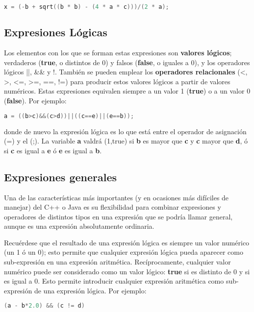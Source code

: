\begin{lstlisting}[language=C++]
x = (-b + sqrt((b * b) - (4 * a * c)))/(2 * a);
\end{lstlisting}

\subsection{Expresiones Lógicas}
Los elementos con los que se forman estas expresiones son \textbf{valores lógicos}; verdaderos (\textbf{true},
o distintos de 0) y falsos (\textbf{false}, o iguales a 0), y los operadores lógicos ||, \&\& y !. También
se pueden emplear los \textbf{operadores relacionales} (<, >, <=, >=, ==, !=) para producir
estos valores lógicos a partir de valores numéricos. Estas expresiones equivalen siempre a un
valor 1 (\textbf{true}) o a un valor 0 (\textbf{false}). Por ejemplo:

\begin{lstlisting}[language=C++]
a = ((b>c)&&(c>d))||((c==e)||(e==b));
\end{lstlisting}

donde de nuevo la expresión lógica es lo que está entre el operador de asignación (=) y el (;).
La variable \textbf{a} valdrá (1,true) si \textbf{b} es mayor que \textbf{c} y \textbf{c} mayor que \textbf{d}, ó si \textbf{c} es igual a \textbf{e} ó \textbf{e} es igual a \textbf{b}.

\subsection{Expresiones generales}
Una de las características más importantes (y en ocasiones más difíciles de manejar) del C++ o Java es
su flexibilidad para combinar expresiones y operadores de distintos tipos en una expresión que
se podría llamar general, aunque es una expresión absolutamente ordinaria.

Recuérdese que el resultado de una expresión lógica es siempre un valor numérico (un 1
ó un 0); esto permite que cualquier expresión lógica pueda aparecer como sub-expresión en
una expresión aritmética. Recíprocamente, cualquier valor numérico puede ser considerado
como un valor lógico: \textbf{true} si es distinto de 0 y  si es igual a 0. Esto permite introducir
cualquier expresión aritmética como sub-expresión de una expresión lógica. Por ejemplo:

\begin{lstlisting}[language=C++]
(a - b*2.0) && (c != d)
\end{lstlisting}

